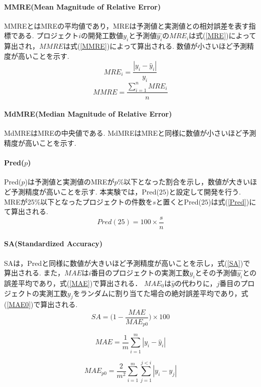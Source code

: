 \paragraph{MMRE(Mean Magnitude of Relative Error) \quad \\}
MMREとはMREの平均値であり，MREは予測値と実測値との相対誤差を表す指標である.
プロジェクト$i$の開発工数値$y_{i}$と予測値$\hat{y_{i}}$の$MRE_{i}$は式(\ref{MRE})によって算出され，$MMRE$は式(\ref{MMRE})によって算出される.
数値が小さいほど予測精度が高いことを示す.
\begin{equation}
  \label{MRE}
  MRE_{i} = \frac{|y_{i}-\hat{y}_{i}|}{y_{i}}
\end{equation}
\begin{equation}
  \label{MMRE}
  MMRE = \frac{\sum_{i=1}^{n}MRE_{i}}{n}
\end{equation}
\paragraph{MdMRE(Median Magnitude of Relative Error) \quad \\}
MdMREはMREの中央値である.
MdMREはMREと同様に数値が小さいほど予測精度が高いことを示す.
\paragraph{Pred($p$) \quad \\}
Pred($p$)\cite{Port2008}は予測値と実測値のMREが$p$\%以下となった割合を示し，数値が大きいほど予測精度が高いことを示す.
本実験では，Pred($25$)と設定して開発を行う.
MREが25\%以下となったプロジェクトの件数を$s$と置くとPred($25$)は式(\ref{Pred})にて算出される.
\begin{equation}
  \label{Pred}
  Pred(25) = 100 \times \frac{s}{n}
\end{equation}
\paragraph{SA(Standardized Accuracy) \quad \\}
SA\cite{Shepperd2012}は，Predと同様に数値が大きいほど予測精度が高いことを示し，式(\ref{SA})で算出される.
また，$MAE$は$i$番目のプロジェクトの実測工数$y_i$とその予測値$\hat{y_i}$との誤差平均であり，式(\ref{MAE})で算出される．
$MAE_{0}$は$\hat{y}$の代わりに，$j$番目のプロジェクトの実測工数$y_j$をランダムに割り当てた場合の絶対誤差平均であり，式(\ref{MAE0})で算出される.
\begin{equation}
  \label{SA}
  SA =\Big(1 - \frac{MAE}{MAE_{p0}} \Big) \times 100
\end{equation}

\begin{equation}
  \label{MAE}
  MAE =\frac{1}{m} \sum_{i=1}^{m} |y_{i} - {\hat{y}_{i}}|
\end{equation}

\begin{equation}
  \label{MAE0}
  MAE_{p0} =\frac{2}{m^2} \sum_{i=1}^{m} \sum_{j=1}^{j<i} |y_{i} - y_{j}|
\end{equation}
